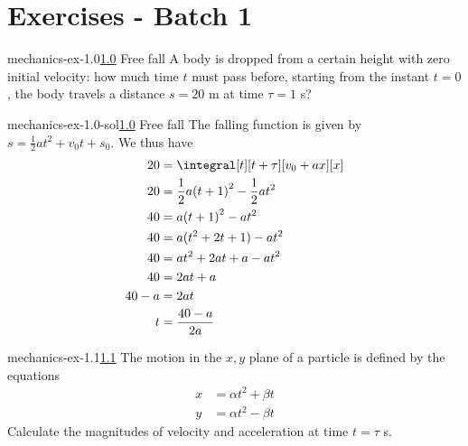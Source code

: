 \documentclass[preview]{standalone}
\begin{document}
\genpage

\section{Exercises - Batch 1}

\begin{snippetexercise}{mechanics-ex-1.0}{\underline{1.0} Free fall}
    A body is dropped from a certain height with zero initial velocity: how much time \(t\) must pass before,
    starting from the instant \(t=0\), the body travels a distance \(s=20\) m at time \(\tau=1\) s?
\end{snippetexercise}

\begin{snippetsolution}{mechanics-ex-1.0-sol}{\underline{1.0} Free fall}
    The falling function is given by \(s = \frac{1}{2}at^2 + v_0t + s_0\).
    We thus have
    \begin{align*}
        20 &= \integral[t][t+\tau][v_0 + ax][x] \\
        20 &= \frac{1}{2}a{(t+1)}^2 - \frac{1}{2}at^2 \\
        40 &= a{(t+1)}^2 - at^2 \\
        40 &= a(t^2 + 2t + 1) - at^2 \\
        40 &= at^2 + 2at + a - at^2 \\
        40 &= 2at + a \\
        40 - a &= 2at \\
        t &= \frac{40 - a}{2a}
    \end{align*}
\end{snippetsolution}

\begin{snippetexercise}{mechanics-ex-1.1}{\underline{1.1}}
    The motion in the \(x, y\) plane of a particle is defined by the equations
    \begin{align*}
        x &= \alpha t^2 + \beta t \\
        y &= \alpha t^2 - \beta t
    \end{align*}
    Calculate the magnitudes of velocity and acceleration at time \(t=\tau\) s.
\end{snippetexercise}
\end{document}

